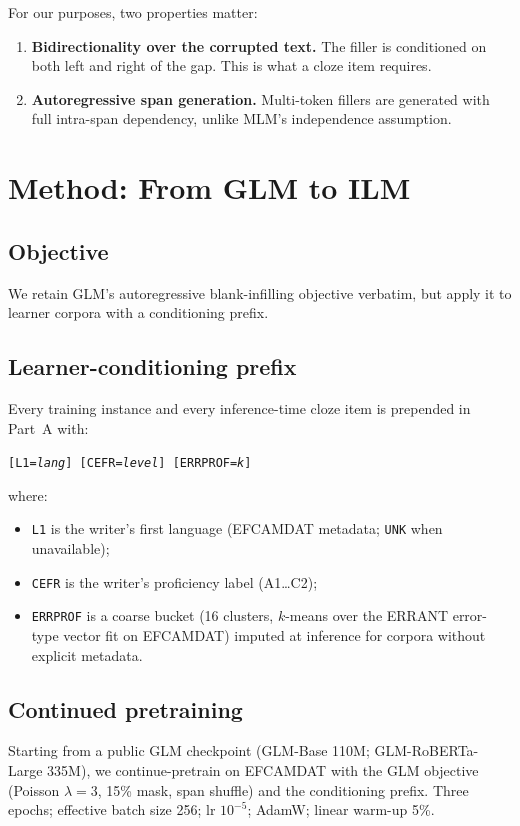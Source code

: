 \documentclass[11pt]{article}
\begin{document}
For our purposes, two properties matter:
\begin{enumerate}[leftmargin=*,itemsep=0.2em]
    \item \textbf{Bidirectionality over the corrupted text.} The filler is
    conditioned on both left and right of the gap. This is what a cloze
    item requires.
    \item \textbf{Autoregressive span generation.} Multi-token fillers are
    generated with full intra-span dependency, unlike MLM's independence
    assumption.
\end{enumerate}

\section{Method: From GLM to ILM}
\label{sec:method}

\subsection{Objective}
We retain GLM's autoregressive blank-infilling objective verbatim, but
apply it to learner corpora with a conditioning prefix.

\subsection{Learner-conditioning prefix}
Every training instance and every inference-time cloze item is prepended
in Part~A with:
\begin{center}
\small\texttt{[L1=\textit{lang}] [CEFR=\textit{level}] [ERRPROF=\textit{k}]}
\end{center}
where:
\begin{itemize}[leftmargin=*,itemsep=0.15em]
    \item \texttt{L1} is the writer's first language (EFCAMDAT metadata;
    \texttt{UNK} when unavailable);
    \item \texttt{CEFR} is the writer's proficiency label
    (A1\ldots C2);
    \item \texttt{ERRPROF} is a coarse bucket (16 clusters, $k$-means over
    the ERRANT error-type vector fit on EFCAMDAT) imputed at inference for
    corpora without explicit metadata.
\end{itemize}

\subsection{Continued pretraining}
Starting from a public GLM checkpoint (GLM-Base 110M;
GLM-RoBERTa-Large 335M), we continue-pretrain on EFCAMDAT with the GLM
objective (Poisson $\lambda{=}3$, 15\% mask, span shuffle) and the
conditioning prefix. Three epochs; effective batch size 256; lr $10^{-5}$;
AdamW; linear warm-up 5\%.
\end{document}
